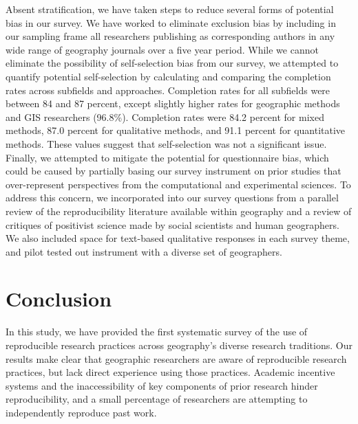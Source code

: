\documentclass[]{interact}
\theoremstyle{plain}%
\theoremstyle{definition}
\theoremstyle{remark}
\begin{document}
Absent stratification, we have taken steps to reduce several forms of potential bias in our survey. 
We have worked to eliminate exclusion bias by including in our sampling frame all researchers publishing as corresponding authors in any wide range of geography journals over a five year period.
While we cannot eliminate the possibility of self-selection bias from our survey, we attempted to quantify potential self-selection by calculating and comparing the completion rates across subfields and approaches. 
Completion rates for all subfields were between 84 and 87 percent, except slightly higher rates for geographic methods and GIS researchers (96.8\%).
Completion rates were 84.2 percent for mixed methods, 87.0 percent for qualitative methods, and 91.1 percent for quantitative methods. 
These values suggest that self-selection was not a significant issue.
Finally, we attempted to mitigate the potential for questionnaire bias, which could be caused by partially basing our survey instrument on prior studies that over-represent perspectives from the computational and experimental sciences.
To address this concern, we incorporated into our survey questions from a parallel review of the reproducibility literature available within geography and a review of critiques of positivist science made by social scientists and human geographers. 
We also included space for text-based qualitative responses in each survey theme, and pilot tested out instrument with a diverse set of geographers.

\section*{Conclusion}
In this study, we have provided the first systematic survey of the use of reproducible research practices across geography's diverse research traditions. 
Our results make clear that geographic researchers are aware of reproducible research practices, but lack direct experience using those practices.
Academic incentive systems and the inaccessibility of key components of prior research hinder reproducibility, and a small percentage of researchers are attempting to independently reproduce past work.  
\end{document}
